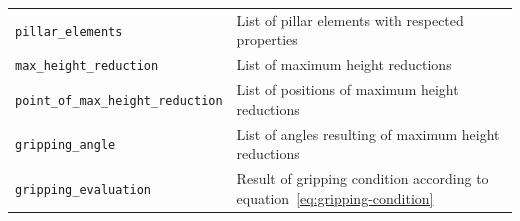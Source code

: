 \documentclass[11pt]{PyRollDocs}
\begin{document}
\begin{table}
\begin{tabular}{ll}
            \texttt{pillar\_elements}                       & List of pillar elements with respected properties                               \\
            \texttt{max\_height\_reduction}                 & List of maximum height reductions                                               \\
            \texttt{point\_of\_max\_height\_reduction}      & List of positions of maximum height reductions                                  \\
            \texttt{gripping\_angle}                        & List of angles resulting of maximum height reductions                           \\
            \texttt{gripping\_evaluation}                   & Result of gripping condition according to equation~\ref{eq:gripping-condition}  \\
            \bottomrule
        \end{tabular}
    \end{table}

    \printbibliography
\end{document}

